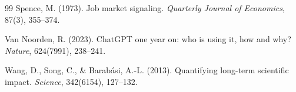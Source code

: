 \documentclass[12pt,a4paper]{article}
\begin{document}
\begin{thebibliography}{99}
Spence, M. (1973).
\newblock Job market signaling.
\newblock \textit{Quarterly Journal of Economics}, 87(3), 355--374.

Van Noorden, R. (2023).
\newblock ChatGPT one year on: who is using it, how and why?
\newblock \textit{Nature}, 624(7991), 238--241.

Wang, D., Song, C., \& Barabási, A.-L. (2013).
\newblock Quantifying long-term scientific impact.
\newblock \textit{Science}, 342(6154), 127--132.

\end{thebibliography}

\newpage
\end{document}
